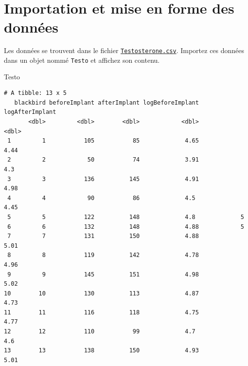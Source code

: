 \documentclass[
  french,
  a4paper,
  DIV=11,
  numbers=noendperiod,
  oneside]{scrreprt}
\newenvironment{Shaded}{}{}
\newcommand{\NormalTok}[1]{\textcolor[rgb]{0.14,0.16,0.18}{#1}}
\begin{document}
\section{Importation et mise en forme des
données}\label{importation-et-mise-en-forme-des-donnuxe9es-1}

Les données se trouvent dans le fichier
\href{data/Testosterone.csv}{\texttt{Testosterone.csv}}. Importez ces
données dans un objet nommé \texttt{Testo} et affichez son contenu.

\begin{Shaded}
\begin{Highlighting}[]
\NormalTok{Testo}
\end{Highlighting}
\end{Shaded}

\begin{verbatim}
# A tibble: 13 x 5
   blackbird beforeImplant afterImplant logBeforeImplant logAfterImplant
       <dbl>         <dbl>        <dbl>            <dbl>           <dbl>
 1         1           105           85             4.65            4.44
 2         2            50           74             3.91            4.3 
 3         3           136          145             4.91            4.98
 4         4            90           86             4.5             4.45
 5         5           122          148             4.8             5   
 6         6           132          148             4.88            5   
 7         7           131          150             4.88            5.01
 8         8           119          142             4.78            4.96
 9         9           145          151             4.98            5.02
10        10           130          113             4.87            4.73
11        11           116          118             4.75            4.77
12        12           110           99             4.7             4.6 
13        13           138          150             4.93            5.01
\end{verbatim}
\end{document}
